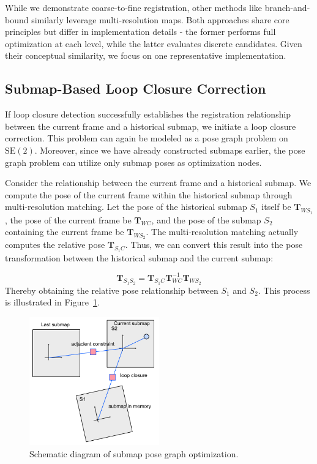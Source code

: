 While we demonstrate coarse-to-fine registration, other methods like branch-and-bound \cite{Hess2016} similarly leverage multi-resolution maps. Both approaches share core principles but differ in implementation details - the former performs full optimization at each level, while the latter evaluates discrete candidates. Given their conceptual similarity, we focus on one representative implementation.

\subsection{Submap-Based Loop Closure Correction}  
If loop closure detection successfully establishes the registration relationship between the current frame and a historical submap, we initiate a loop closure correction. This problem can again be modeled as a pose graph problem on $\mathrm{SE}(2)$. Moreover, since we have already constructed submaps earlier, the pose graph problem can utilize only submap poses as optimization nodes.

Consider the relationship between the current frame and a historical submap. We compute the pose of the current frame within the historical submap through multi-resolution matching. Let the pose of the historical submap $S_1$ itself be $\mathbf{T}_{W S_1}$, the pose of the current frame be $\mathbf{T}_{WC}$, and the pose of the submap $S_2$ containing the current frame be $\mathbf{T}_{W S_2}$. The multi-resolution matching actually computes the relative pose $\mathbf{T}_{S_1 C}$. Thus, we can convert this result into the pose transformation between the historical submap and the current submap:

\begin{equation}\label{key}
	\mathbf{T}_{S_1 S_2} = \mathbf{T}_{S_1 C} \mathbf{T}_{WC}^{-1} \mathbf{T}_{W S_2}
\end{equation}
Thereby obtaining the relative pose relationship between $S_1$ and $S_2$. This process is illustrated in Figure~\ref{fig:submap-pose-graph}.

\begin{figure}[!htp]
	\centering
	\includegraphics[width=0.5\textwidth]{resources/2d-lidar-mapping/submap-pose-graph.pdf}
	\caption{Schematic diagram of submap pose graph optimization.}
	\label{fig:submap-pose-graph}
\end{figure}

